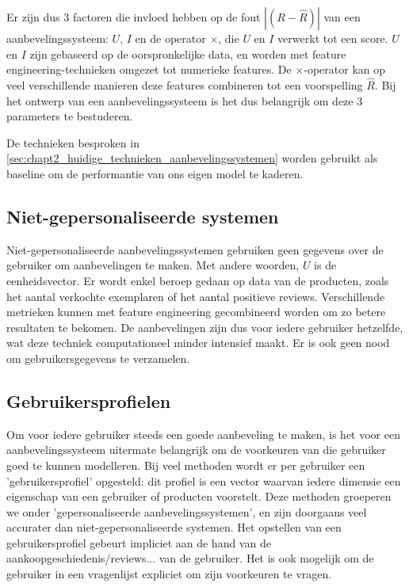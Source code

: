 Er zijn dus 3 factoren die invloed hebben op de fout $|(R - \hat{R})|$ van een aanbevelingssysteem: $U$, $I$ en de operator $\times$, die $U$ en $I$ verwerkt tot een score. $U$ en $I$ zijn gebaseerd op de oorspronkelijke data, en worden met feature engineering-technieken omgezet tot numerieke features. De $\times$-operator kan op veel verschillende manieren deze features combineren tot een voorspelling $\hat{R}$. Bij het ontwerp van een aanbevelingssysteem is het dus belangrijk om deze 3 parameters te bestuderen.

De technieken besproken in \autoref{sec:chapt2_huidige_technieken_aanbevelingssystemen} worden gebruikt als baseline om de performantie van ons eigen model te kaderen.


\subsection{Niet-gepersonaliseerde systemen}
\label{sec:chapt2_non_persionalised}
Niet-gepersonaliseerde aanbevelingssystemen gebruiken geen gegevens over de gebruiker om aanbevelingen te maken. Met andere woorden, $U$ is de eenheidsvector. Er wordt enkel beroep gedaan op data van de producten, zoals het aantal verkochte exemplaren of het aantal positieve reviews. Verschillende metrieken kunnen met feature engineering gecombineerd worden om zo betere resultaten te bekomen. De aanbevelingen zijn dus voor iedere gebruiker hetzelfde, wat deze techniek computationeel minder intensief maakt. Er is ook geen nood om gebruikersgegevens te verzamelen.

\subsection{Gebruikersprofielen}
\label{sub:chapt2_gebruikersprofielen}
Om voor iedere gebruiker steeds een goede aanbeveling te maken, is het voor een aanbevelingssysteem uitermate belangrijk om de voorkeuren van die gebruiker goed te kunnen modelleren. Bij veel methoden wordt er per gebruiker een 'gebruikersprofiel' opgesteld: dit profiel is een vector waarvan iedere dimensie een eigenschap van een gebruiker of producten voorstelt. Deze methoden groeperen we onder 'gepersonaliseerde aanbevelingssystemen', en zijn doorgaans veel accurater dan niet-gepersonaliseerde systemen. Het opstellen van een gebruikersprofiel gebeurt impliciet aan de hand van de aankoopgeschiedenis/reviews... van de gebruiker. Het is ook mogelijk om de gebruiker in een vragenlijst expliciet om zijn voorkeuren te vragen.


